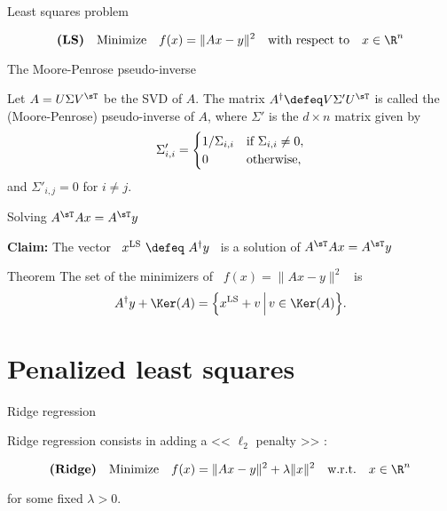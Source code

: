 \documentclass{beamer}
\begin{document}
\begin{frame}[t]{Least squares problem}
	\grid

	\begin{exampleblock}
		$$
		\textbf{(LS)} \quad \text{Minimize} \quad f(x) = \| Ax - y \|^2 \quad \text{with respect to} \quad x \in \R^n
		$$
	\end{exampleblock}

\end{frame}
\begin{frame}[t]{The Moore-Penrose pseudo-inverse}
	\grid

	\vspace{-0.4cm}
\begin{definition}
	Let $A = U \Sigma V^{\sT}$ be the SVD of $A$.
	The matrix $A^{\dagger} \defeq V \Sigma' U^{\sT}$ is called the (Moore-Penrose) pseudo-inverse of $A$, where $\Sigma'$ is the $d \times n$ matrix given by 
	\vspace{-0.4cm}
	$$
	\Sigma'_{i,i} =
	\begin{cases}
		1 / \Sigma_{i,i} & \text{if} \ \Sigma_{i,i} \neq 0, \\
		0 & \text{otherwise},
	\end{cases}
	\vspace{-0.2cm}
	$$
	and $\Sigma'_{i,j} = 0$ for $i \neq j$.
\end{definition}

\end{frame}

\begin{frame}[t]{Solving $A^{\sT} A x = A^{\sT} y$}
	\grid

	\vspace{-0.1cm}
	\textbf{Claim:} The vector \ $x^{\rm LS} \ \defeq  \ A^{\dagger} y$ \ is a solution of $A^{\sT} A x = A^{\sT} y$

	\vspace{2cm}

	\begin{block}{Theorem}
		The set of the minimizers of \ $f(x) = \|Ax - y\|^2$ \ is
	$$
	A^{\dagger} y + \Ker(A) = \Big\{ x^{\rm LS} + v \, \Big| \, v \in \Ker(A) \Big\}.
	$$
\end{block}
\end{frame}

\section{Penalized least squares}

\begin{frame}[t]{Ridge regression}
	\grid

	\vspace{-0.1cm}
	Ridge regression consists in adding a << $\ell_2$ penalty >> :
	\vspace{-0.3cm}
	\begin{exampleblock}
		$$
		\textbf{(Ridge)} \quad \text{Minimize} \quad f(x) = \| Ax - y \|^2 + \lambda \|x\|^2 \quad \text{w.r.t.} \quad x \in \R^n
		$$
	\end{exampleblock}
	for some fixed $\lambda > 0$.

\end{frame}
\end{document}
